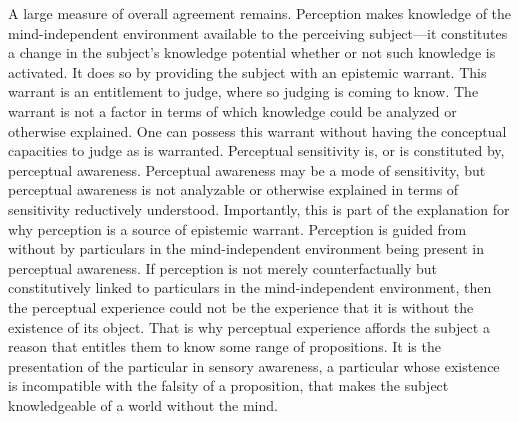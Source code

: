 \documentclass[12pt]{article}
\begin{document}

A large measure of overall agreement remains. Perception makes knowledge of the mind-inde\-pen\-dent environment available to the perceiving subject---it constitutes a change in the subject's knowledge potential whether or not such knowledge is activated. It does so by providing the subject with an epistemic warrant. This warrant is an entitlement to judge, where so judging is coming to know. The warrant is not a factor in terms of which knowledge could be analyzed or otherwise explained. One can possess this warrant without having the conceptual capacities to judge as is warranted. Perceptual sensitivity is, or is constituted by, perceptual awareness. Perceptual awareness may be a mode of sensitivity, but perceptual awareness is not analyzable or otherwise explained in terms of sensitivity reductively understood. Importantly, this is part of the explanation for why perception is a source of epistemic warrant. Perception is guided from without by particulars in the mind-independent environment being present in perceptual awareness. If perception is not merely counterfactually but constitutively linked to particulars in the mind-independent environment, then the perceptual experience could not be the experience that it is without the existence of its object. That is why perceptual experience affords the subject a reason that entitles them to know some range of propositions. It is the presentation of the particular in sensory awareness, a particular whose existence is incompatible with the falsity of a proposition, that makes the subject knowledgeable of a world without the mind.

\end{document}
